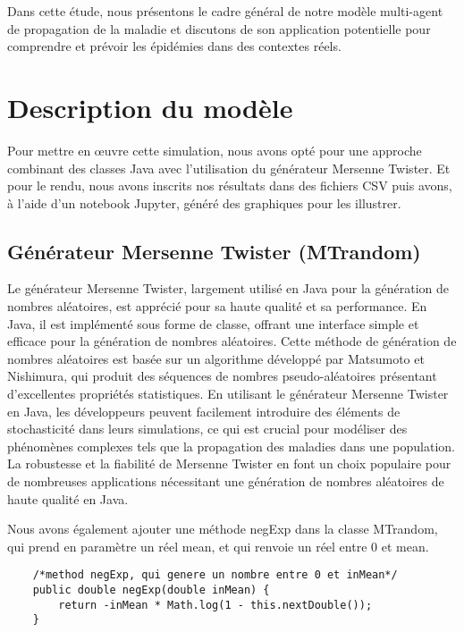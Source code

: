 \documentclass[french]{article}
\begin{document}
Dans cette étude, nous présentons le cadre général de notre modèle multi-agent de propagation de la maladie et discutons de son application potentielle pour comprendre et prévoir les épidémies dans des contextes réels.

\section{Description du modèle}

Pour mettre en œuvre cette simulation, nous avons opté pour une approche combinant des classes Java avec l'utilisation du générateur Mersenne Twister. Et pour le rendu, nous avons inscrits nos résultats dans des fichiers CSV puis avons, à l'aide d'un notebook Jupyter, généré des graphiques pour les illustrer.

\subsection{Générateur Mersenne Twister (MTrandom)} \label{sec/MT}

Le générateur Mersenne Twister, largement utilisé en Java pour la génération de nombres aléatoires, est apprécié pour sa haute qualité et sa performance. En Java, il est implémenté sous forme de classe, offrant une interface simple et efficace pour la génération de nombres aléatoires. Cette méthode de génération de nombres aléatoires est basée sur un algorithme développé par Matsumoto et Nishimura, qui produit des séquences de nombres pseudo-aléatoires présentant d'excellentes propriétés statistiques. En utilisant le générateur Mersenne Twister en Java, les développeurs peuvent facilement introduire des éléments de stochasticité dans leurs simulations, ce qui est crucial pour modéliser des phénomènes complexes tels que la propagation des maladies dans une population. La robustesse et la fiabilité de Mersenne Twister en font un choix populaire pour de nombreuses applications nécessitant une génération de nombres aléatoires de haute qualité en Java.

Nous avons également ajouter une méthode negExp dans la classe MTrandom, qui prend en paramètre un réel mean, et qui renvoie un réel entre 0 et mean.

\begin{lstlisting}
	/*method negExp, qui genere un nombre entre 0 et inMean*/
	public double negExp(double inMean) {
        return -inMean * Math.log(1 - this.nextDouble());
    }
\end{lstlisting} 
\end{document}
